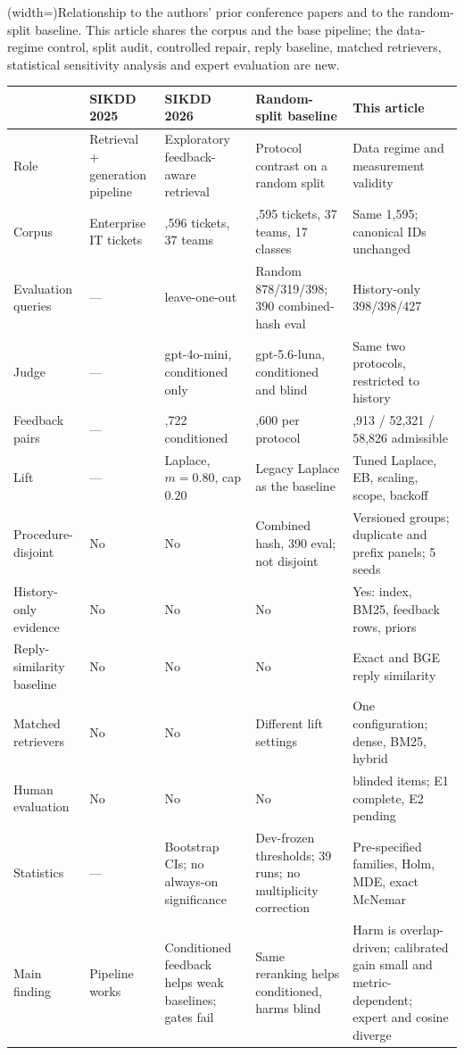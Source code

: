 \documentclass{ieeeaccess}
\begin{document}
\Table[!btp](width=\textwidth){Relationship to the authors' prior conference
papers and to the random-split baseline. This article shares the
corpus and the base pipeline; the data-regime control, split audit, controlled
repair, reply baseline, matched retrievers, statistical sensitivity analysis and
expert evaluation are new.\label{tab:prior}}{
\scriptsize
\begin{tabularx}{\textwidth}{@{}p{}>{\raggedright\arraybackslash}X>{\raggedright\arraybackslash}X>{\raggedright\arraybackslash}X>{\raggedright\arraybackslash}X@{}}
\toprule
 & SIKDD 2025 & SIKDD 2026 & Random-split baseline & This article \\
\midrule
Role & Retrieval + generation pipeline & Exploratory feedback-aware retrieval & Protocol contrast on a random split & Data regime and measurement validity \\
Corpus & Enterprise IT tickets & 1,596 tickets, 37 teams & 1,595 tickets, 37 teams, 17 classes & Same 1,595; canonical IDs unchanged \\
Evaluation queries & --- & 250 leave-one-out & Random 878/319/398; 390 combined-hash eval & History-only 398/398/427 \\
Judge & --- & gpt-4o-mini, conditioned only & gpt-5.6-luna, conditioned and blind & Same two protocols, restricted to history \\
Feedback pairs & --- & 102,722 conditioned & 175,600 per protocol & 94,913 / 52,321 / 58,826 admissible \\
Lift & --- & Laplace, $m=0.80$, cap $0.20$ & Legacy Laplace as the baseline & Tuned Laplace, EB, scaling, scope, backoff \\
Procedure-disjoint & No & No & Combined hash, 390 eval; not disjoint & Versioned groups; duplicate and prefix panels; 5 seeds \\
History-only evidence & No & No & No & Yes: index, BM25, feedback rows, priors \\
Reply-similarity baseline & No & No & No & Exact and BGE reply similarity \\
Matched retrievers & No & No & Different lift settings & One configuration; dense, BM25, hybrid \\
Human evaluation & No & No & No & 105 blinded items; E1 complete, E2 pending \\
Statistics & --- & Bootstrap CIs; no always-on significance & Dev-frozen thresholds; 39 runs; no multiplicity correction & Pre-specified families, Holm, MDE, exact McNemar \\
Main finding & Pipeline works & Conditioned feedback helps weak baselines; gates fail & Same reranking helps conditioned, harms blind & Harm is overlap-driven; calibrated gain small and metric-dependent; expert and cosine diverge \\
\bottomrule
\end{tabularx}}
\end{document}
